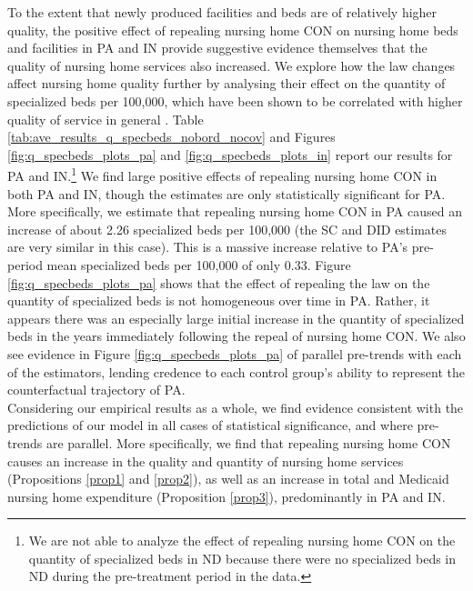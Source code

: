 \documentclass[../Main.tex]{subfiles}
\begin{document}
\indent To the extent that newly produced facilities and beds are of relatively higher quality, the positive effect of repealing nursing home CON on nursing home beds and facilities in PA and IN provide suggestive evidence themselves that the quality of nursing home services also increased. We explore how the law changes affect nursing home quality further by analysing their effect on the quantity of specialized beds per 100,000, which have been shown to be correlated with higher quality of service in general \citep{grabowski2010quality}. Table \ref{tab:ave_results_q_specbeds_nobord_nocov} and Figures \ref{fig:q_specbeds_plots_pa} and \ref{fig:q_specbeds_plots_in} report our results for PA and IN.\footnote{We are not able to analyze the effect of repealing nursing home CON on the quantity of specialized beds in ND because there were no specialized beds in ND during the pre-treatment period in the data.} We find large positive effects of repealing nursing home CON in both PA and IN, though the estimates are only statistically significant for PA. More specifically, we estimate that repealing nursing home CON in PA caused an increase of about 2.26 specialized beds per 100,000 (the SC and DID estimates are very similar in this case). This is a massive increase relative to PA's pre-period mean specialized beds per 100,000 of only 0.33. Figure \ref{fig:q_specbeds_plots_pa} shows that the effect of repealing the law on the quantity of specialized beds is not homogeneous over time in PA. Rather, it appears there was an especially large initial increase in the quantity of specialized beds in the years immediately following the repeal of nursing home CON. We also see evidence in Figure \ref{fig:q_specbeds_plots_pa} of parallel pre-trends with each of the estimators, lending credence to each control group's ability to represent the counterfactual trajectory of PA.\\
\indent Considering our empirical results as a whole, we find evidence consistent with the predictions of our model in all cases of statistical significance, and where pre-trends are parallel. More specifically, we find that repealing nursing home CON causes an increase in the quality and quantity of nursing home services (Propositions \ref{prop1} and \ref{prop2}), as well as an increase in total and Medicaid nursing home expenditure (Proposition \ref{prop3}), predominantly in PA and IN.
\end{document}
